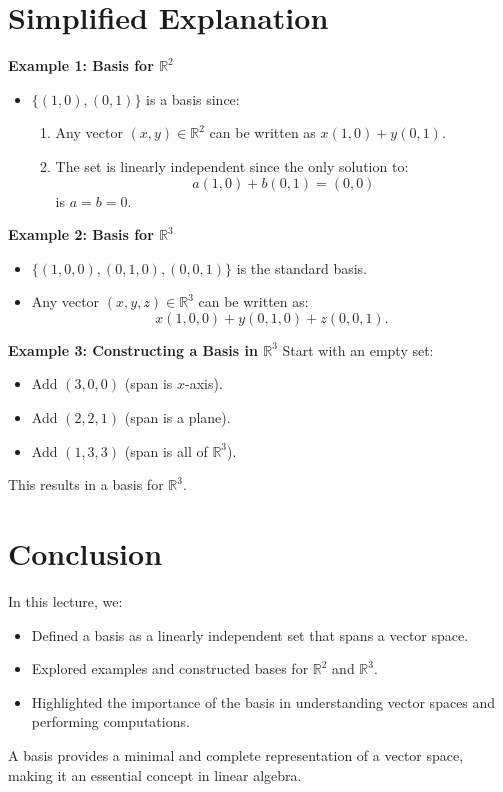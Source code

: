 \documentclass{article}
\begin{document}
\section*{Simplified Explanation}

\textbf{Example 1: Basis for $\mathbb{R}^2$}
\begin{itemize}
  \item $\{(1, 0), (0, 1)\}$ is a basis since:
    \begin{enumerate}
      \item Any vector $(x, y) \in \mathbb{R}^2$ can be written as $x(1, 0) + y(0, 1)$.
      \item The set is linearly independent since the only solution to:
        \[
          a(1, 0) + b(0, 1) = (0, 0)
        \]
        is $a = b = 0$.
    \end{enumerate}
\end{itemize}

\textbf{Example 2: Basis for $\mathbb{R}^3$}
\begin{itemize}
  \item $\{(1, 0, 0), (0, 1, 0), (0, 0, 1)\}$ is the standard basis.
  \item Any vector $(x, y, z) \in \mathbb{R}^3$ can be written as:
    \[
      x(1, 0, 0) + y(0, 1, 0) + z(0, 0, 1).
    \]
\end{itemize}

\textbf{Example 3: Constructing a Basis in $\mathbb{R}^3$}
Start with an empty set:
\begin{itemize}
  \item Add $(3, 0, 0)$ (span is $x$-axis).
  \item Add $(2, 2, 1)$ (span is a plane).
  \item Add $(1, 3, 3)$ (span is all of $\mathbb{R}^3$).
\end{itemize}
This results in a basis for $\mathbb{R}^3$.

\section*{Conclusion}

In this lecture, we:
\begin{itemize}
  \item Defined a basis as a linearly independent set that spans a vector space.
  \item Explored examples and constructed bases for $\mathbb{R}^2$ and $\mathbb{R}^3$.
  \item Highlighted the importance of the basis in understanding vector spaces and performing computations.
\end{itemize}

A basis provides a minimal and complete representation of a vector space, making it an essential concept in linear algebra.
\end{document}
